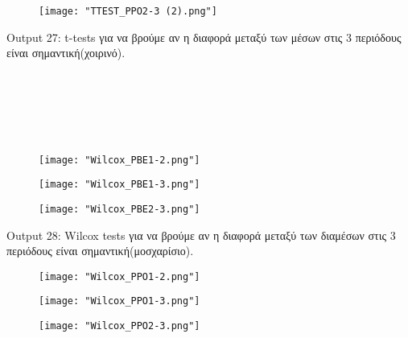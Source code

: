 \documentclass[10pt]{article}
\begin{document}
\begin{figure}[H]
    \centering
    \texttt{[image: "TTEST\_PPO2-3 (2).png"]}
    
    \label{fig:galaxy}
\end{figure}

\begin{centering}


\renewcommand{\caption}{Output 27: }
\caption { t-tests για να βρούμε αν η διαφορά μεταξύ των μέσων στις 3 περιόδους είναι σημαντική(χοιρινό). }
\end{centering}

\

\

\

\begin{figure}[H]
    \centering
    \texttt{[image: "Wilcox\_PBE1-2.png"]}
    
    \label{fig:galaxy}
\end{figure}

\begin{figure}[H]
    \centering
    \texttt{[image: "Wilcox\_PBE1-3.png"]}
    
    \label{fig:galaxy}
\end{figure}

\begin{figure}[H]
    \centering
    \texttt{[image: "Wilcox\_PBE2-3.png"]}
    
    \label{fig:galaxy}
\end{figure}

\begin{centering}


\renewcommand{\caption}{Output 28: }
\caption { Wilcox tests για να βρούμε αν η διαφορά μεταξύ των διαμέσων στις 3 περιόδους είναι σημαντική(μοσχαρίσιο). }
\end{centering}


\begin{figure}[H]
    \centering
    \texttt{[image: "Wilcox\_PPO1-2.png"]}
    
    \label{fig:galaxy}
\end{figure}

\begin{figure}[H]
    \centering
    \texttt{[image: "Wilcox\_PPO1-3.png"]}
    
    \label{fig:galaxy}
\end{figure}

\begin{figure}[H]
    \centering
    \texttt{[image: "Wilcox\_PPO2-3.png"]}
    
    \label{fig:galaxy}
\end{figure}
\end{document}
